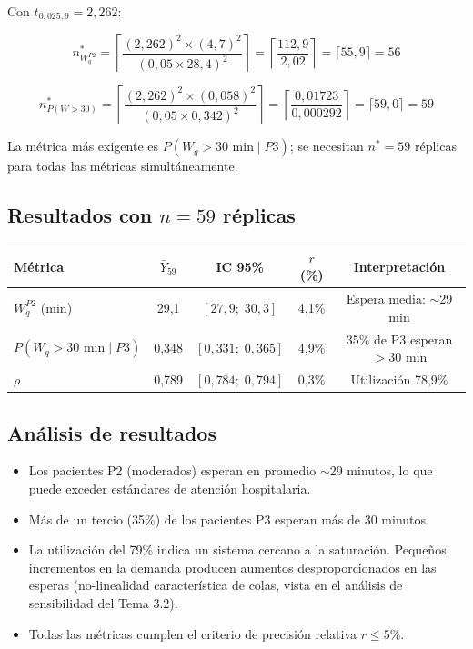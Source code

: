 \documentclass[11pt, letterpaper]{article}
\begin{document}
Con $t_{0{,}025,9} = 2{,}262$:

\[
n^*_{W_q^{P2}} = \left\lceil\frac{(2{,}262)^2 \times (4{,}7)^2}{(0{,}05 \times 28{,}4)^2}\right\rceil = \left\lceil\frac{112{,}9}{2{,}02}\right\rceil = \lceil 55{,}9\rceil = 56
\]

\[
n^*_{P(W>30)} = \left\lceil\frac{(2{,}262)^2 \times (0{,}058)^2}{(0{,}05 \times 0{,}342)^2}\right\rceil = \left\lceil\frac{0{,}01723}{0{,}000292}\right\rceil = \lceil 59{,}0\rceil = 59
\]

La métrica más exigente es $P(W_q>30\text{ min}\mid P3)$; se necesitan $n^* = 59$ réplicas para todas las métricas simultáneamente.

\subsection{Resultados con $n=59$ réplicas}

\begin{center}\small
\renewcommand{\arraystretch}{1.3}
\begin{tabular}{lcccc}
\toprule
\textbf{Métrica} & $\bar Y_{59}$ & IC 95\% & $r$ (\%) & \textbf{Interpretación} \\
\midrule
$W_q^{P2}$ (min)             & 29{,}1 & $[27{,}9;\;30{,}3]$ & 4{,}1\% & Espera media: $\sim$29 min \\
$P(W_q>30\text{ min}\mid P3)$& 0{,}348 & $[0{,}331;\;0{,}365]$ & 4{,}9\% & 35\% de P3 esperan $>$30 min \\
$\rho$                       & 0{,}789 & $[0{,}784;\;0{,}794]$ & 0{,}3\% & Utilización 78{,}9\% \\
\bottomrule
\end{tabular}
\end{center}

\subsection{Análisis de resultados}

\begin{itemize}
    \item Los pacientes P2 (moderados) esperan en promedio $\sim$29 minutos, lo que puede exceder estándares de atención hospitalaria.
    \item Más de un tercio (35\%) de los pacientes P3 esperan más de 30 minutos.
    \item La utilización del 79\% indica un sistema cercano a la saturación. Pequeños incrementos en la demanda producen aumentos desproporcionados en las esperas (no-linealidad característica de colas, vista en el análisis de sensibilidad del Tema 3.2).
    \item Todas las métricas cumplen el criterio de precisión relativa $r \le 5\%$.
\end{itemize}
\end{document}
